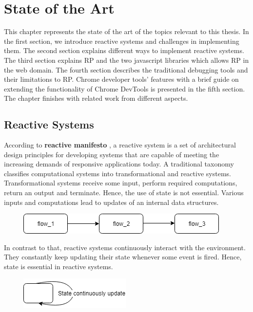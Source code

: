\chapter{State of the Art} \label{chap:State of the Art}

This chapter represents the state of the art of the topics relevant to this thesis. In the first section, we introduce reactive systems and challenges in implementing them. The second section explains different ways to implement reactive systems. The third section explains RP and the two javascript libraries which allows RP in the web domain. The fourth section describes the traditional debugging tools and their limitations to RP. Chrome developer tools' features with a brief guide on extending the functionality of Chrome DevTools is presented in the fifth section. The chapter finishes with related work from different aspects.

\section{Reactive Systems}
According to \textbf{reactive manifesto} \cite{reactiveManifesto}, a reactive system is a set of architectural design principles for developing systems that are capable of meeting the increasing demands of responsive applications today. A traditional taxonomy classifies computational systems into transformational and reactive systems. Transformational systems receive some input, perform required computations, return an output and terminate. Hence, the use of state is not essential. Various inputs and computations lead to updates of an internal data structures.

\begin{figure}[!h]
	\centering
	\includegraphics[scale=0.6,trim=0 0 0 0]{images/transformational-systems.png}
	\label{fig:transformational-systems}
\end{figure}

In contrast to that, reactive systems continuously interact with the environment. They constantly keep updating their state whenever some event is fired. Hence, state is essential in reactive systems.

\begin{figure}[!h]
	\centering
	\includegraphics[scale=0.6,trim=0 0 0 0]{images/reactive-systems.png}
	\label{fig:reactive-systems}
\end{figure}

